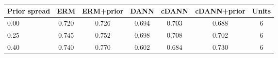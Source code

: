 \begin{tabular}{lccccc c}
\toprule
Prior spread & ERM & ERM+prior & DANN & cDANN & cDANN+prior & Units \\
\midrule
0.00 & 0.720 & 0.726 & 0.694 & 0.703 & 0.688 & 6 \\
0.25 & 0.745 & 0.752 & 0.698 & 0.708 & 0.702 & 6 \\
0.40 & 0.740 & 0.770 & 0.602 & 0.684 & 0.730 & 6 \\
\bottomrule
\end{tabular}